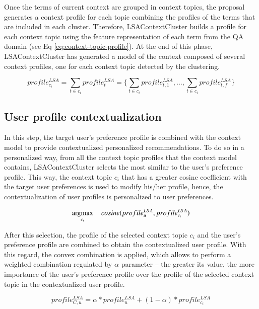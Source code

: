 \documentclass[preprint]{elsarticle}
\newcommand{\argmax}{\operatornamewithlimits{argmax}}
\begin{document}
\begin{spacing}{1.5}
Once the terms of current context are grouped in context topics, the proposal generates a context profile for each topic combining the profiles of the terms that are included in each cluster. Therefore, LSAContextCluster builds a profile for each context topic using the feature representation of each term from the QA domain (see Eq \ref{eq:context-topic-profile}). At the end of this phase, LSAContextCluster has generated a model of the context composed of several context profiles, one for each context topic detected by the clustering.

\begin{equation}
	profile^{LSA}_{c_i} = \sum_{t \in c_i} profile^{LSA}_{t}=\{\sum_{t \in c_i} profile^{LSA}_{t,1}, \dots, \sum_{t \in c_i} profile^{LSA}_{t,f} \}
	\label{eq:context-topic-profile}
\end{equation}

\subsection{User profile contextualization}

In this step, the target user's preference profile is combined with the context model to provide contextualized personalized recommendations. To do so in a personalized way, from all the context topic profiles that the context model contains, LSAContextCluster selects the most similar to the user's preference profile. This way, the context topic $c_i$ that has a greater cosine coefficient with the target user preferences is used to modify his/her profile, hence, the contextualization of user profiles is personalized to user preferences.

\begin{equation}
	\argmax_{c_i}~~~~ cosine(profile^{LSA}_u,profile^{LSA}_{c_i})
\end{equation}

After this selection, the profile of the selected context topic $c_i$ and the user's preference profile are combined to obtain the contextualized user profile. With this regard, the convex combination is applied, which allows to perform a weighted combination regulated by $\alpha$ parameter -- the greater its value, the more importance of the user's preference profile over the profile of the selected context topic in the contextualized user profile.

\begin{equation}
	profile^{LSA}_{C,u} = \alpha * profile^{LSA}_u + (1- \alpha )*profile^{LSA}_{c_i}
\end{equation}


\end{spacing}
\end{document}
